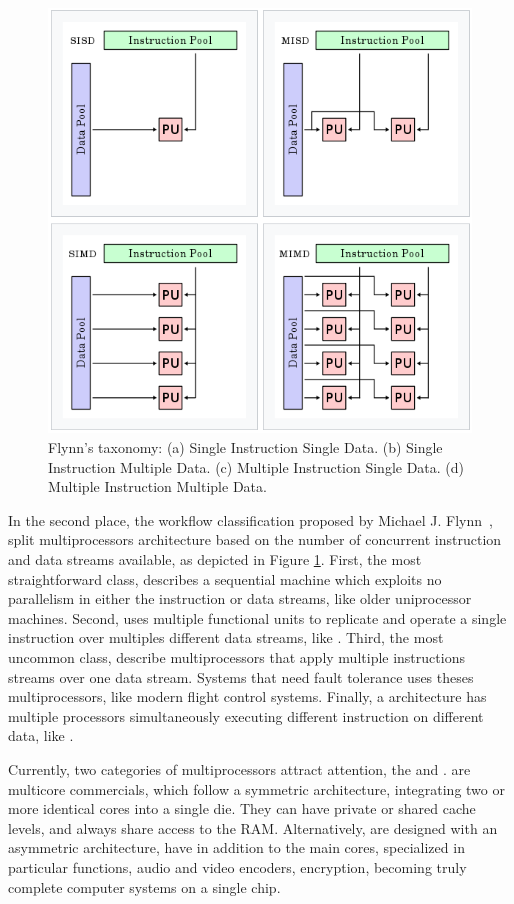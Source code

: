 			\begin{figure}[h]
				\centering
				\includegraphics[width=.6\textwidth]{images/flynn.png}

				\caption{
					Flynn's taxonomy:
					(a) Single Instruction Single Data.
					(b) Single Instruction Multiple Data.
					(c) Multiple Instruction Single Data.
					(d) Multiple Instruction Multiple Data.
				}\par
				\label{fig.flynn}
			\end{figure}

			In the second place, the workflow classification proposed by Michael J. Flynn~\cite{flynn:1972},
			split multiprocessors architecture based on the number of concurrent
			instruction and data streams available, as depicted in Figure \ref{fig.flynn}.
			First, the most straightforward class, \sisd describes a sequential
			machine which exploits no parallelism in either the instruction or
			data streams, like older uniprocessor machines.
			Second, \simd uses multiple functional units to replicate and operate
			a single instruction over multiples different data streams, like \gpu.
			Third, the most uncommon class, \misd describe multiprocessors that
			apply multiple instructions streams over one data stream.
			Systems that need fault tolerance uses theses multiprocessors, like
			modern flight control systems.
			Finally, a \mimd architecture has multiple processors simultaneously
			executing different instruction on different data, like \xeonphi.

			Currently, two categories of multiprocessors attract attention, the \cmp and \soc.
			\cmps are multicore commercials, which follow a symmetric architecture,
			integrating two or more identical cores into a single die.
			They can have private or shared cache levels, and always share access
			to the RAM.
			Alternatively, \socs are designed with an asymmetric architecture,
			have in addition to the main cores, specialized \cpus in particular
			functions, \eg audio and video encoders, encryption, becoming truly
			complete computer systems on a single chip.

